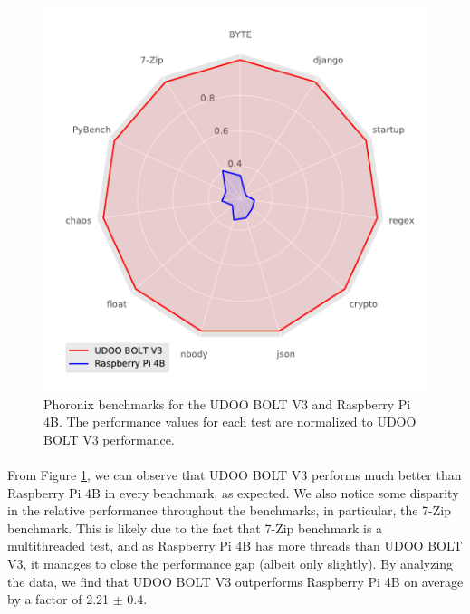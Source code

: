 \clearpage 

\begin{figure}[H]
    \centering
    \includegraphics[width=0.8 \linewidth]{images/phoronix-benchmarks.pdf}
    \caption [Phoronix benchmarks for the UDOO BOLT V3 and Raspberry Pi 4B.]{ Phoronix benchmarks for the UDOO BOLT V3 and Raspberry Pi 4B. The performance values for each test are normalized to UDOO BOLT V3 performance.}
    \label{fig:phronix-benchmarks}
\end{figure}


\paragraph{} From Figure \ref{fig:phronix-benchmarks}, we can observe that UDOO BOLT V3 performs much better than Raspberry Pi 4B in every benchmark, as expected. We also notice some disparity in the relative performance throughout the benchmarks, in particular, the 7-Zip benchmark. This is likely due to the fact that 7-Zip benchmark is a multithreaded test, and as Raspberry Pi 4B has more threads than UDOO BOLT V3, it manages to close the performance gap (albeit only slightly). By analyzing the data, we find that UDOO BOLT V3 outperforms Raspberry Pi 4B on average by a factor of 2.21 $\pm$ 0.4.

